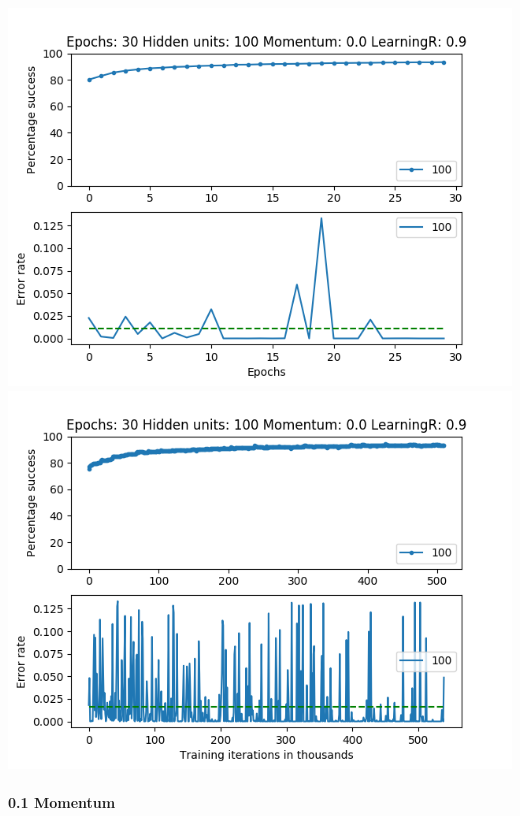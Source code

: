 \documentclass[11pt]{article}
\makeatletter
\def\maxwidth{\ifdim\Gin@nat@width>\linewidth\linewidth
    \else\Gin@nat@width\fi}
\let\Oldincludegraphics\includegraphics
\renewcommand{\includegraphics}[1]{\Oldincludegraphics[width=.8\maxwidth]{#1}}
\makeatother
\begin{document}
\includegraphics{Experiment2/E2_NN_Epoch_Momentum_0.0_30Epochs_100Hiddenunits.png}
\includegraphics{Experiment2/E2_NN_Training_Momentum_0.0_30Epochs_100Hiddenunits.png}

\hypertarget{momentum-1}{%
\paragraph{0.1 Momentum}\label{momentum-1}}
\end{document}
